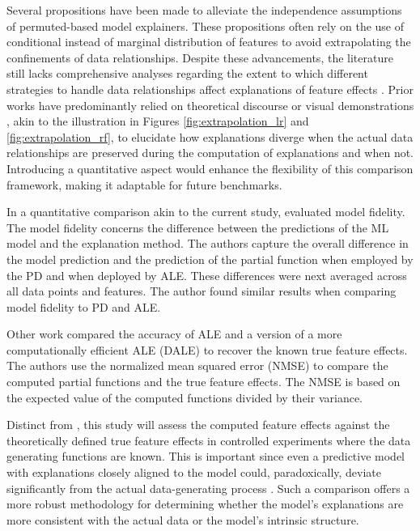 Several propositions have been made to alleviate the independence assumptions of permuted-based model explainers. These propositions often rely on the use of conditional instead of marginal distribution of features to avoid extrapolating the confinements of data relationships. Despite these advancements, the literature still lacks comprehensive analyses regarding the extent to which different strategies to handle data relationships affect explanations of feature effects \cite{Molnar2022GeneralModels}. Prior works have predominantly relied on theoretical discourse or visual demonstrations \cite{Apley2020VisualizingModels, Gkolemis2022DALE:Explanations, Gkolemis2023RHALE:Effects, Mangalathu2022Machine-learningSystems, Bakhshi2021UtilizingModels}, akin to the illustration in Figures \ref{fig:extrapolation_lr} and \ref{fig:extrapolation_rf}, to elucidate how explanations diverge when the actual data relationships are preserved during the computation of explanations and when not. Introducing a quantitative aspect would enhance the flexibility of this comparison framework, making it adaptable for future benchmarks. 

In a quantitative comparison akin to the current study, \cite{Molnar2023Model-agnosticApproach} evaluated model fidelity. The model fidelity concerns the difference between the predictions of the ML model and the explanation method. The authors capture the overall difference in the model prediction and the prediction of the partial function when employed by the PD and when deployed by ALE. These differences were next averaged across all data points and features. The author found similar results when comparing model fidelity to PD and ALE.

Other work \cite{Gkolemis2022DALE:Explanations} compared the accuracy of ALE and a version of a more computationally efficient ALE (DALE) to recover the known true feature effects. The authors use the normalized mean squared error (NMSE) to compare the computed partial functions and the true feature effects. The NMSE is based on the expected value of the computed functions divided by their variance. 

Distinct from \cite{Molnar2023Model-agnosticApproach}, this study will assess the computed feature effects against the theoretically defined true feature effects in controlled experiments where the data generating functions are known. This is important since even a predictive model with explanations closely aligned to the model could, paradoxically, deviate significantly from the actual data-generating process \cite{Fisher2018AllSimultaneously, Slack2020FoolingSHAP}.  Such a comparison offers a more robust methodology for determining whether the model's explanations are more consistent with the actual data or the model's intrinsic structure. 

